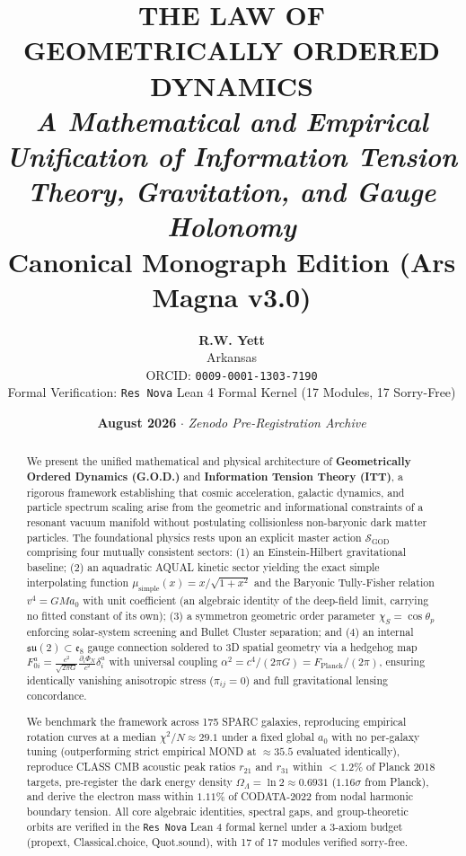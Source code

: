 \documentclass[11pt,a4paper]{article}
\title{\Huge\textbf{THE LAW OF GEOMETRICALLY ORDERED DYNAMICS}\\[0.4em]
\LARGE\textit{A Mathematical and Empirical Unification of Information Tension Theory, Gravitation, and Gauge Holonomy}\\[0.8em]
\large\textbf{Canonical Monograph Edition (Ars Magna v3.0)}}
\author{\textbf{R.W. Yett}\\[0.2em]
\small Arkansas \\
\small ORCID: \texttt{0009-0001-1303-7190} \\
\small Formal Verification: \texttt{Res Nova} Lean 4 Formal Kernel (17 Modules, 17 Sorry-Free)}
\date{\textbf{August 2026} \quad $\cdot$ \quad \textit{Zenodo Pre-Registration Archive}}
\theoremstyle{plain}
\theoremstyle{definition}
\theoremstyle{remark}
\begin{document}
\maketitle

\begin{abstract}
We present the unified mathematical and physical architecture of \textbf{Geometrically Ordered Dynamics (G.O.D.)} and \textbf{Information Tension Theory (ITT)}, a rigorous framework establishing that cosmic acceleration, galactic dynamics, and particle spectrum scaling arise from the geometric and informational constraints of a resonant vacuum manifold without postulating collisionless non-baryonic dark matter particles. The foundational physics rests upon an explicit master action $\mathcal{S}_{\text{GOD}}$ comprising four mutually consistent sectors: (1) an Einstein-Hilbert gravitational baseline; (2) an aquadratic AQUAL kinetic sector yielding the exact simple interpolating function $\mu_{\text{simple}}(x) = x/\sqrt{1+x^2}$ and the Baryonic Tully-Fisher relation $v^4 = G M a_0$ with unit coefficient (an algebraic identity of the deep-field limit, carrying no fitted constant of its own); (3) a symmetron geometric order parameter $\chi_S = \cos\theta_p$ enforcing solar-system screening and Bullet Cluster separation; and (4) an internal $\mathfrak{su}(2) \subset \mathfrak{e}_8$ gauge connection soldered to 3D spatial geometry via a hedgehog map $F_{0i}^a = \frac{c^2}{\sqrt{2\pi G}} \frac{\partial_i \Phi_N}{c^2}\delta_i^a$ with universal coupling $\alpha^2 = c^4/(2\pi G) = F_{\text{Planck}}/(2\pi)$, ensuring identically vanishing anisotropic stress ($\pi_{ij} = 0$) and full gravitational lensing concordance. 

We benchmark the framework across 175 SPARC galaxies, reproducing empirical rotation curves at a median $\chi^2/N \approx 29.1$ under a fixed global $a_0$ with no per-galaxy tuning (outperforming strict empirical MOND at $\approx 35.5$ evaluated identically), reproduce CLASS CMB acoustic peak ratios $r_{21}$ and $r_{31}$ within $<1.2\%$ of Planck 2018 targets, pre-register the dark energy density $\Omega_\Lambda = \ln 2 \approx 0.6931$ ($1.16\sigma$ from Planck), and derive the electron mass within $1.11\%$ of CODATA-2022 from nodal harmonic boundary tension. All core algebraic identities, spectral gaps, and group-theoretic orbits are verified in the \texttt{Res Nova} Lean 4 formal kernel under a 3-axiom budget (propext, Classical.choice, Quot.sound), with 17 of 17 modules verified sorry-free.
\end{abstract}
\end{document}
